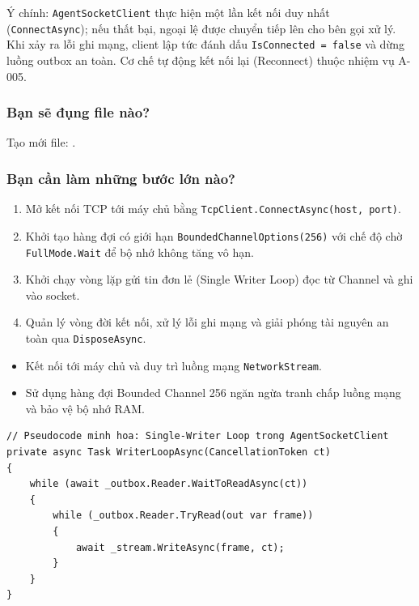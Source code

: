 \documentclass[12pt,a4paper]{article}
\begin{document}
Ý chính: \texttt{AgentSocketClient} thực hiện một lần kết nối duy nhất (\texttt{ConnectAsync}); nếu thất bại, ngoại lệ được chuyển tiếp lên cho bên gọi xử lý. Khi xảy ra lỗi ghi mạng, client lập tức đánh dấu \texttt{IsConnected = false} và dừng luồng outbox an toàn. Cơ chế tự động kết nối lại (Reconnect) thuộc nhiệm vụ A-005.

\subsubsection{Bạn sẽ đụng file nào?}
Tạo mới file: .

\subsubsection{Bạn cần làm những bước lớn nào?}
\begin{enumerate}
  \item Mở kết nối TCP tới máy chủ bằng \texttt{TcpClient.ConnectAsync(host, port)}.
  \item Khởi tạo hàng đợi có giới hạn \texttt{BoundedChannelOptions(256)} với chế độ chờ \texttt{FullMode.Wait} để bộ nhớ không tăng vô hạn.
  \item Khởi chạy vòng lặp gửi tin đơn lẻ (Single Writer Loop) đọc từ Channel và ghi vào socket.
  \item Quản lý vòng đời kết nối, xử lý lỗi ghi mạng và giải phóng tài nguyên an toàn qua \texttt{DisposeAsync}.
\end{enumerate}

\begin{orientationbox}
\begin{itemize}[leftmargin=1.5em, itemsep=1pt]
  \item Kết nối tới máy chủ và duy trì luồng mạng \texttt{NetworkStream}.
  \item Sử dụng hàng đợi Bounded Channel 256 ngăn ngừa tranh chấp luồng mạng và bảo vệ bộ nhớ RAM.
\end{itemize}
\end{orientationbox}

\begin{lstlisting}[language=CSharp, caption={Pseudocode minh họa: Vòng lặp gửi tin đơn lẻ Single-Writer Loop}]
// Pseudocode minh hoa: Single-Writer Loop trong AgentSocketClient
private async Task WriterLoopAsync(CancellationToken ct)
{
    while (await _outbox.Reader.WaitToReadAsync(ct))
    {
        while (_outbox.Reader.TryRead(out var frame))
        {
            await _stream.WriteAsync(frame, ct);
        }
    }
}
\end{lstlisting}
\end{document}
